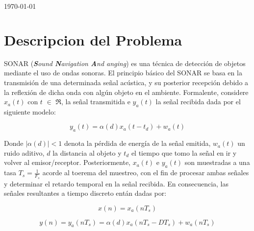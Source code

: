 \documentclass[letterpaper,11pt]{article}
\begin{document}
\begin{titlepage}


{\large \today}\\[2cm] 


\vfill 

\end{titlepage}

\newpage
\tableofcontents

\newpage

\section{Descripcion del Problema}

SONAR (\textit{\textbf{S}ound \textbf{N}avigation \textbf{A}nd anging}) es una técnica de detección de objetos mediante el uso de ondas sonoras. El principio básico del SONAR se basa en la transmisión de una determinada señal acústica, y su posterior recepción debido a la reflexión de dicha onda con algún objeto en el ambiente. Formalente, considere $x_{a}(t)$ con $t$ $\in$ $\Re$, la señal transmitida e $y_{a}(t)$ la señal recibida dada por el siguiente modelo:

\begin{equation}
y_{a}(t) = \alpha(d)x_{a}(t-t_{d}) + w_{a}(t)
\label{modelo}
\end{equation}

Donde $|\alpha(d)| <  1$  denota la pérdida de energía de la señal emitida, $w_{a}(t)$ un ruido aditivo, $d$ la distancia al objeto y $t_{d}$ el tiempo que tomo la señal en ir y volver al emisor/receptor. Posteriormente, $x_{a}(t)$ e $y_{a}(t)$ son muestradas a una tasa $T_{s} = \frac{1}{F_{s}}$ acorde al toerema del muestreo, con el fin de procesar ambas señales y determinar el retardo temporal en la señal recibida. En consecuencia, las señales resultantes a tiempo discreto entán dadas por:


\begin{equation}
x(n) = x_{a}(nT_{s})
\end{equation}

\begin{equation}
y(n) = y_{a}(nT_{s}) = \alpha(d)x_{a}(nT_{s}-DT_{s}) + w_{a}(nT_{s})
\label{modelo2}
\end{equation}
\end{document}
